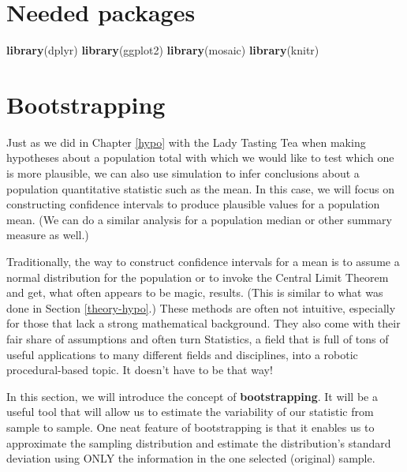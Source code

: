 \documentclass[]{tufte-book}
\newenvironment{Shaded}{\begin{snugshade}}{\end{snugshade}}
\newcommand{\KeywordTok}[1]{\textcolor[rgb]{0.13,0.29,0.53}{\textbf{{#1}}}}
\newcommand{\NormalTok}[1]{{#1}}
\begin{document}
\section*{Needed packages}\label{needed-packages-4}

\begin{Shaded}
\begin{Highlighting}[]
\KeywordTok{library}\NormalTok{(dplyr)}
\KeywordTok{library}\NormalTok{(ggplot2)}
\KeywordTok{library}\NormalTok{(mosaic)}
\KeywordTok{library}\NormalTok{(knitr)}
\end{Highlighting}
\end{Shaded}

\section{Bootstrapping}\label{bootstrapping}

Just as we did in Chapter \ref{hypo} with the Lady Tasting Tea when
making hypotheses about a population total with which we would like to
test which one is more plausible, we can also use simulation to infer
conclusions about a population quantitative statistic such as the mean.
In this case, we will focus on constructing confidence intervals to
produce plausible values for a population mean. (We can do a similar
analysis for a population median or other summary measure as well.)

Traditionally, the way to construct confidence intervals for a mean is
to assume a normal distribution for the population or to invoke the
Central Limit Theorem and get, what often appears to be magic, results.
(This is similar to what was done in Section \ref{theory-hypo}.) These
methods are often not intuitive, especially for those that lack a strong
mathematical background. They also come with their fair share of
assumptions and often turn Statistics, a field that is full of tons of
useful applications to many different fields and disciplines, into a
robotic procedural-based topic. It doesn't have to be that way!

In this section, we will introduce the concept of
\textbf{bootstrapping}. It will be a useful tool that will allow us to
estimate the variability of our statistic from sample to sample. One
neat feature of bootstrapping is that it enables us to approximate the
sampling distribution and estimate the distribution's standard deviation
using ONLY the information in the one selected (original) sample.
\end{document}
